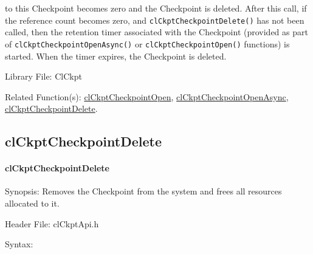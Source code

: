 \begin{flushleft}
\begin{Desc}
 to this Checkpoint becomes zero and the Checkpoint is deleted. After this call, if the reference count becomes zero, and 
 {\tt{clCkptCheckpointDelete()}} has not been called, then the retention timer associated with the Checkpoint (provided as part of 
 {\tt{clCkptCheckpointOpenAsync()}} or {\tt{clCkptCheckpointOpen()}} functions) is started. When the timer expires, the Checkpoint is
 deleted.\end{Desc}
\begin{Desc}
\item[Library File:]Cl\-Ckpt\end{Desc}
\begin{Desc}
\item[Related Function(s):]\hyperlink{pageckpt103}{cl\-Ckpt\-Checkpoint\-Open}, \hyperlink{pageckpt104}{cl\-Ckpt\-Checkpoint\-Open\-Async}, 
\hyperlink{pageckpt106 }{cl\-Ckpt\-Checkpoint\-Delete}. \end{Desc}
\newpage


\subsection{clCkptCheckpointDelete}
\hypertarget{pageckpt106}{}\paragraph{cl\-Ckpt\-Checkpoint\-Delete}\label{pageckpt106}
\begin{Desc}
\item[Synopsis:]Removes the Checkpoint from the system and frees all resources allocated to it.\end{Desc}
\begin{Desc}
\item[Header File:]clCkptApi.h\end{Desc}
\begin{Desc}
\item[Syntax:]


\end{Desc}
\end{flushleft}
